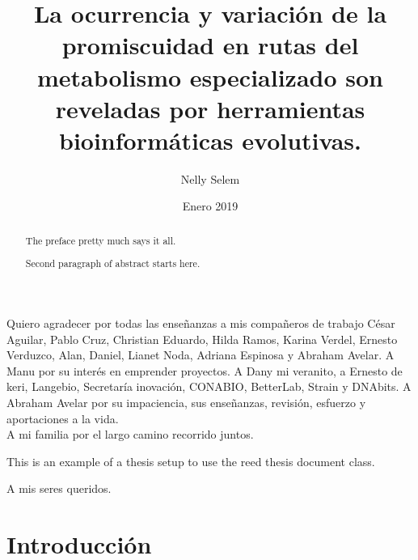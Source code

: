 \documentclass[12pt,twoside]{reedthesis}
\title{La ocurrencia y variación de la promiscuidad en rutas del metabolismo
especializado son reveladas por herramientas bioinformáticas evolutivas.}
\author{Nelly Selem}
\date{Enero 2019}
\begin{document}
      \maketitle
  
  \frontmatter %
  \pagestyle{empty} %

      \begin{acknowledgements}
      Quiero agradecer por todas las enseñanzas a mis compañeros de trabajo
      César Aguilar, Pablo Cruz, Christian Eduardo, Hilda Ramos, Karina
      Verdel, Ernesto Verduzco, Alan, Daniel, Lianet Noda, Adriana Espinosa y
      Abraham Avelar. A Manu por su interés en emprender proyectos. A Dany mi
      veranito, a Ernesto de keri, Langebio, Secretaría inovación, CONABIO,
      BetterLab, Strain y DNAbits. A Abraham Avelar por su impaciencia, sus
      enseñanzas, revisión, esfuerzo y aportaciones a la vida.\\
      A mi familia por el largo camino recorrido juntos.
    \end{acknowledgements}
  
      \begin{preface}
      This is an example of a thesis setup to use the reed thesis document
      class.
    \end{preface}
  
      \hypersetup{linkcolor=black}
    \setcounter{tocdepth}{3}
    \tableofcontents
  
      \listoftables
  
      \listoffigures
  
      \begin{abstract}
      The preface pretty much says it all. \par  Second paragraph of abstract
      starts here.
    \end{abstract}
  
      \begin{dedication}
      A mis seres queridos.
    \end{dedication}
  
  \mainmatter %
  \pagestyle{fancyplain} %

  \chapter*{Introducción}\label{introduccion}
  
\end{document}
